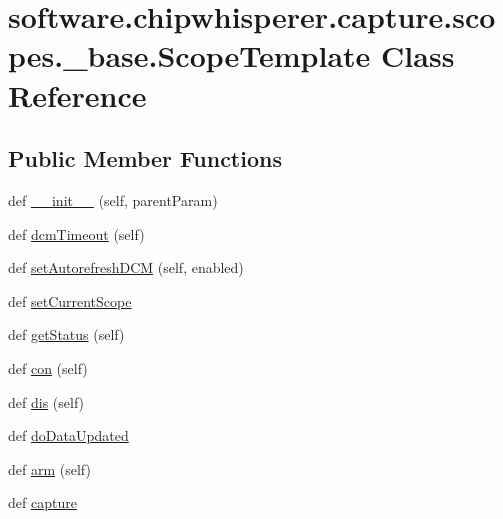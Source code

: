 \hypertarget{classsoftware_1_1chipwhisperer_1_1capture_1_1scopes_1_1__base_1_1ScopeTemplate}{}\section{software.\+chipwhisperer.\+capture.\+scopes.\+\_\+base.\+Scope\+Template Class Reference}
\label{classsoftware_1_1chipwhisperer_1_1capture_1_1scopes_1_1__base_1_1ScopeTemplate}
\subsection*{Public Member Functions}
\begin{DoxyCompactItemize}
\item 
def \hyperlink{classsoftware_1_1chipwhisperer_1_1capture_1_1scopes_1_1__base_1_1ScopeTemplate_ac244babb9957eaec12a5d0ee590701c9}{\+\_\+\+\_\+init\+\_\+\+\_\+} (self, parent\+Param)
\item 
def \hyperlink{classsoftware_1_1chipwhisperer_1_1capture_1_1scopes_1_1__base_1_1ScopeTemplate_a2f09d129e94cdb07cf59a90d96c8c6aa}{dcm\+Timeout} (self)
\item 
def \hyperlink{classsoftware_1_1chipwhisperer_1_1capture_1_1scopes_1_1__base_1_1ScopeTemplate_ac42c62a13da9b973d991f35736a26956}{set\+Autorefresh\+D\+C\+M} (self, enabled)
\item 
def \hyperlink{classsoftware_1_1chipwhisperer_1_1capture_1_1scopes_1_1__base_1_1ScopeTemplate_a1470708fb60b194a3434ae218de5a39e}{set\+Current\+Scope}
\item 
def \hyperlink{classsoftware_1_1chipwhisperer_1_1capture_1_1scopes_1_1__base_1_1ScopeTemplate_aedd6c8235e85885f84a9ce39b8c266fe}{get\+Status} (self)
\item 
def \hyperlink{classsoftware_1_1chipwhisperer_1_1capture_1_1scopes_1_1__base_1_1ScopeTemplate_a561c6ffc125764b0911ad5f476fcece5}{con} (self)
\item 
def \hyperlink{classsoftware_1_1chipwhisperer_1_1capture_1_1scopes_1_1__base_1_1ScopeTemplate_a6e16f0340398b8e68b3fe5f5a2d5fb06}{dis} (self)
\item 
def \hyperlink{classsoftware_1_1chipwhisperer_1_1capture_1_1scopes_1_1__base_1_1ScopeTemplate_a0d1bf4cf777a2f1b40d5256ba2477341}{do\+Data\+Updated}
\item 
def \hyperlink{classsoftware_1_1chipwhisperer_1_1capture_1_1scopes_1_1__base_1_1ScopeTemplate_a971c3bd2ff3aeca4c5fb2e4e940d31dd}{arm} (self)
\item 
def \hyperlink{classsoftware_1_1chipwhisperer_1_1capture_1_1scopes_1_1__base_1_1ScopeTemplate_a23925e83ce30dc9b944bc615d0b8f3af}{capture}
\end{DoxyCompactItemize}
